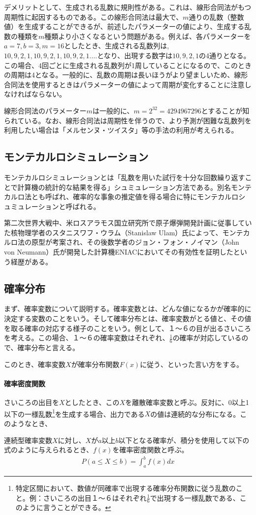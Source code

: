\documentclass[dvipdfmx]{jsarticle}
\begin{document}
デメリットとして、生成される乱数に規則性がある。これは、線形合同法がもつ周期性に起因するものである。この線形合同法は最大で、$m$通りの乱数（整数値）を生成することができるが、前述したパラメーターの値により、生成する乱数の種類を$m$種類より小さくなるという問題がある。例えば、各パラメーターを$a = 7, b = 3, m = 16$としたとき、生成される乱数列は,$10, 9, 2, 1, 10, 9, 2, 1, 10, 9, 2, 1....$となり、出現する数字は$10, 9, 2, 1$の4通りとなる。この場合、4回ごとに生成される乱数列が1周していることになるので、このときの周期は4となる。一般的に、乱数の周期は長いほうがより望ましいため、線形合同法を使用するときはパラメーターの値によって周期が変化することに注意しなければならない。\par
線形合同法のパラメーター$m$は一般的に、$m = 2^{32} = 4294967296$とすることが知られている。なお、線形合同法は周期性を伴うので、より予測が困難な乱数列を利用したい場合は「メルセンヌ・ツイスタ」等の手法の利用が考えられる。
\subsection{モンテカルロシミュレーション}
モンテカルロシミュレーションとは「乱数を用いた試行を十分な回数繰り返すことで計算機の統計的な結果を得る」シュミュレーション方法である。別名モンテカルロ法とも呼ばれ、確率的な事象の推定値を得る場合に特にモンテカルロシュミュレーションと呼ばれる。\par
第二次世界大戦中、米ロスアラモス国立研究所で原子爆弾開発計画に従事していた核物理学者のスタニスワフ・ウラム（Stanislaw Ulam）氏によって、モンテカルロ法の原型が考案され、その後数学者のジョン・フォン・ノイマン（John von Neumann）氏が開発した計算機ENIACにおいてその有効性を証明したという経歴がある。
\subsection{確率分布}
まず、確率変数について説明する。確率変数とは、どんな値になるかが確率的に決定する変数のことをいう。そして確率分布とは、確率変数がとる値と、その値を取る確率の対応する様子のことをいう。例として、１〜６の目が出るさいころを考える。この場合、１〜６の確率変数はそれぞれ、$\frac{1}{6}$の確率が対応しているので、確率分布と言える。\par
このとき、確率変数$X$が確率分布関数$F(x)$に従う、といった言い方をする。
\paragraph{確率密度関数}さいころの出目を$X$としたとき、この$X$を離散確率変数と呼ぶ。反対に、0以上1以下の一様乱数\footnote{特定区間において、数値が同確率で出現する確率分布関数に従う乱数のこと。例：さいころの出目１〜６はそれぞれ$\frac{1}{6}で出現する一様乱数である$、このように言うことができる。}を生成する場合、出力である$X$の値は連続的な分布になる。このようなとき、
\begin{center}
  連続型確率変数$X$に対し、$X$が$a以上b以下となる確率が、$積分を使用して以下の式のように与えられるとき、$f(x)$を確率密度関数と呼ぶ。
  \begin{align*}
    P(a \leq X \leq b) = \int^b_a f(x)dx
  \end{align*}
\end{center}
\end{document}
